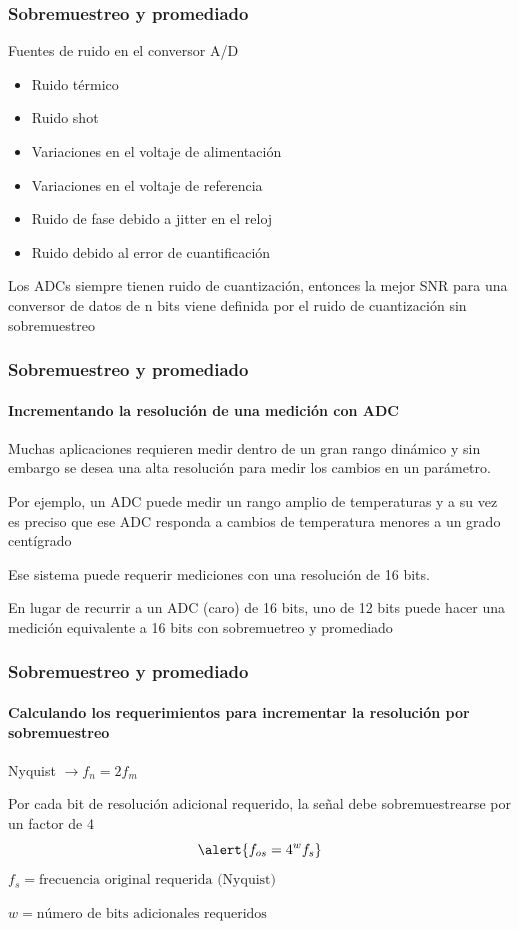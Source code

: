 \documentclass{beamer}
\begin{document}
\begin{frame}
\frametitle{Sobremuestreo y promediado}
\begin{block}{Fuentes de ruido en el conversor A/D}
\begin{itemize}
\item Ruido térmico
\item Ruido shot
\item Variaciones en el voltaje de alimentación
\item Variaciones en el voltaje de referencia
\item Ruido de fase debido a jitter en el reloj
\item Ruido debido al error de cuantificación
\end{itemize}
\end{block}
{
\begin{block}{}
Los ADCs siempre tienen ruido de cuantización, entonces la mejor SNR para una
conversor de datos de n bits viene definida por el ruido de cuantización sin
sobremuestreo
\end{block}}
\end{frame}

\begin{frame}
\frametitle{Sobremuestreo y promediado}
\framesubtitle{Incrementando la resolución de una medición con ADC}
{
\begin{block}{}
Muchas aplicaciones requieren medir dentro de un gran rango dinámico y sin
embargo se desea una alta resolución para medir los cambios en un parámetro.
\end{block}
}
Por ejemplo, un ADC puede medir un rango amplio de temperaturas y a su vez es
preciso que ese ADC responda a cambios de temperatura menores a un grado
centígrado

Ese sistema puede requerir mediciones con una resolución de 16 bits.
{
\begin{block}{}
En lugar de recurrir a un ADC (caro) de 16 bits, uno de 12 bits puede hacer una
medición equivalente a 16 bits con sobremuetreo y promediado 
\end{block}
}
\end{frame}

\begin{frame}
\frametitle{Sobremuestreo y promediado}
\framesubtitle{Calculando los requerimientos para incrementar la resolución por
sobremuestreo}
Nyquist $\rightarrow f_n = 2 f_m$
{
\begin{block}{}
Por cada bit de resolución adicional requerido, la señal debe sobremuestrearse
por un factor de 4
$$\alert{f_{os} = 4^w f_s}$$ 
$f_s = \text{frecuencia original requerida (Nyquist)}$

$w = \text{número de bits adicionales requeridos}$
\end{block}
}
\end{frame}
\end{document}
